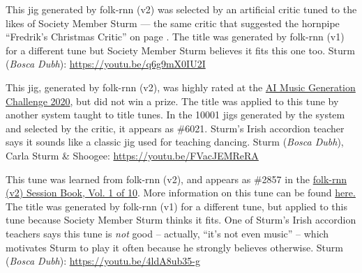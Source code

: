 \documentclass[a4paper,notitlepage,twoside]{book}
\begin{document}
{}  
 
\hypertarget{jig:TeelinBrood}{}
This jig generated by folk-rnn (v2) was selected by an artificial critic 
tuned to the likes of Society Member Sturm --- the same critic that suggested
the hornpipe ``Fredrik's Christmas Critic'' on page \pageref{tune:FredriksChristmasCritic}.
The title was generated by folk-rnn (v1) for a different tune
but Society Member Sturm believes it fits this one too.
Sturm ({\em Bosca Dubh}): \url{https://youtu.be/q6g9mX0IU2I}

{}  
  
\hypertarget{jig:Happytojeer}{}
This jig, generated by folk-rnn (v2),
was highly rated at the \href{https://highnoongmt.wordpress.com/2020/11/20/the-ai-music-generation-challenge-2020-summary-and-results/}{AI Music Generation Challenge 2020},
but did not win a prize. 
The title was applied to this tune by another system taught to title tunes.
In the 10001 jigs generated by the system and selected by the critic,
it appears as \#6021.
Sturm's Irish accordion teacher says it sounds like a classic jig 
used for teaching dancing.
Sturm ({\em Bosca Dubh}), Carla Sturm \& Shoogee: \url{https://youtu.be/FVacJEMReRA}

{}  
\hypertarget{jig:GarrettFarmors}{}
This tune was learned from folk-rnn (v2),
and appears as \#2857 in
the \href{https://highnoongmt.wordpress.com/2018/01/05/volumes-1-20-of-folk-rnn-v1-transcriptions}{folk-rnn (v2) Session Book, Vol. 1 of 10}.
More information on this tune can be found \href{https://highnoongmt.wordpress.com/2017/12/02/folk-rnn-v2-tune-2857/}{here.}
The title was generated by folk-rnn (v1) for a different tune, 
but applied to this tune because Society Member Sturm thinks it fits.
One of Sturm's Irish accordion teachers says this tune is {\em not} good -- actually, ``it's not even music'' --
which motivates Sturm to play it often because he strongly believes otherwise.
Sturm ({\em Bosca Dubh}): \url{https://youtu.be/4ldA8ub35-g}

\clearpage
\end{document}

